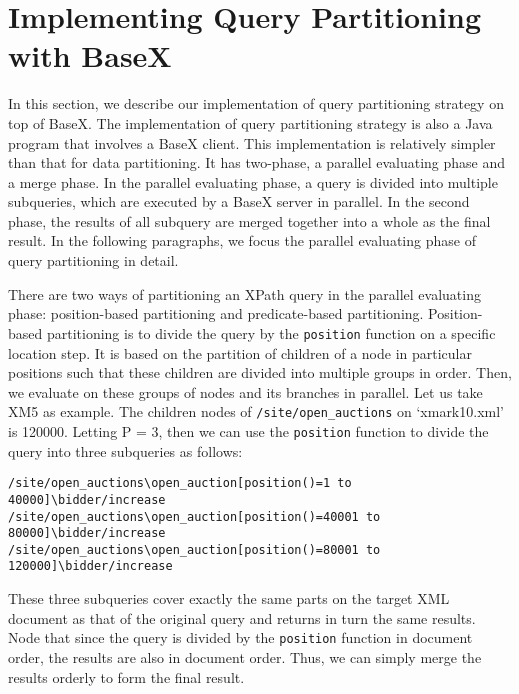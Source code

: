 \section{Implementing Query Partitioning with BaseX}
\label{sect:qpsimpl}

In this section, we describe our implementation of query partitioning strategy on top of
BaseX. The implementation of query partitioning strategy is also a Java program that
involves a BaseX client. This implementation
is relatively simpler than that for data partitioning.  It has two-phase, 
a parallel evaluating phase and a merge phase.  In the
parallel evaluating phase, a query is divided into multiple subqueries, which 
are executed by a BaseX server in parallel. In the second phase,
the results of all subquery are merged together into a whole as the final
result. In the following paragraphs, we focus the parallel evaluating phase 
of query partitioning in detail.


There are two ways of partitioning an XPath query in the
parallel evaluating phase: position-based partitioning and predicate-based
partitioning. Position-based partitioning is to divide the query by the
\texttt{position} function on a specific location step.  It is based on the
partition of children of a node in particular positions such that these children
are divided into multiple groups in order. Then, we evaluate on these groups of
nodes and its branches in parallel. Let us take XM5 as example. The children
nodes of \texttt{/site/open\_auctions} on `xmark10.xml' is 120000. Letting P =
3, then we can use the \texttt{position} function to divide the query into three
subqueries as follows:\\
\begin{small}
	\verb|/site/open_auctions\open_auction[position()=1 to 40000]\bidder/increase|\\
	\verb|/site/open_auctions\open_auction[position()=40001 to 80000]\bidder/increase|\\
	\verb|/site/open_auctions\open_auction[position()=80001 to 120000]\bidder/increase|\\
\end{small}
These three subqueries cover exactly the same parts on the target XML document 
as that of the original query and returns in turn the same results. 
Node that since the query is divided
by the \texttt{position} function in document order, the results are also in
document order. Thus, we can simply merge the results orderly to form the final
result.


